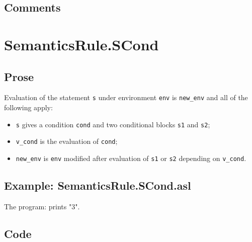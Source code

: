 \documentclass{book}
\begin{document}
    \subsection{Comments}

\section{SemanticsRule.SCond \label{sec:SemanticsRule.SCond}}

    \subsection{Prose}
  Evaluation of the statement \texttt{s} under environment \texttt{env} is
\texttt{new\_env} and all of the following apply:
    \begin{itemize}
    \item \texttt{s} gives a condition \texttt{cond} and two conditional blocks \texttt{s1} and \texttt{s2};
    \item \texttt{v\_cond} is the evaluation of \texttt{cond};
    \item \texttt{new\_env} is \texttt{env} modified after evaluation of \texttt{s1} or \texttt{s2} depending on
      \texttt{v\_cond}.
    \end{itemize}

    \subsection{Example: SemanticsRule.SCond.asl}
    The program:
    prints "3".

  \subsection{Code}
\end{document}
